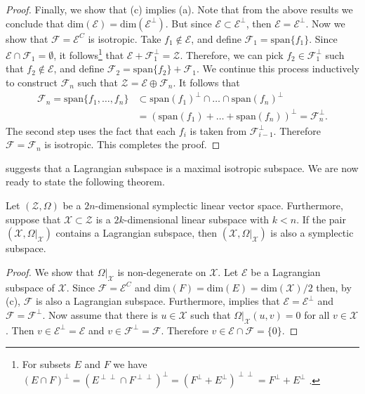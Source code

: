 \begin{proof}
Finally, we show that (c) implies (a). Note that from the above results we conclude that dim$(\mathcal E) = \text{dim}(\mathcal E^{\perp})$. But since $\mathcal E \subset \mathcal E^{\perp}$, then $\mathcal E = \mathcal E^{\perp}$. Now we show that $\mathcal F = \mathcal E^{C}$ is isotropic. Take $f_1 \notin \mathcal E$, and define $\mathcal F_1 = \text{span}\{f_1\}$. Since $\mathcal E \cap \mathcal F_1 = \emptyset$, it follows\footnote{For subsets $E$ and $F$ we have $(E\cap F)^{\perp} = (E^{\perp \perp} \cap F^{\perp \perp})^{\perp} =( F^\perp + E^{\perp})^{\perp \perp} = F^{\perp} + E^\perp$ \cite{abraham1978foundations}.} that $\mathcal E + \mathcal F_1^{\perp} = \mathcal Z$. Therefore, we can pick $f_2\in \mathcal F_1^{\perp}$ such that $f_2\notin \mathcal E$, and define $\mathcal F_2 = \text{span}\{f_2\} + \mathcal F_1$. We continue this process inductively to construct $\mathcal F_n$ such that $\mathcal Z = \mathcal E \oplus \mathcal F_n$. It follows that 
\begin{equation*}
\begin{aligned}
	\mathcal F_n = \text{span}\{f_1,\dots,f_n\} & \subset \text{span}(f_1)^{\perp} \cap \dots \cap \text{span}(f_n)^{\perp} \\
	&= (\text{span}(f_1) + \dots + \text{span}(f_n))^{\perp} =  \mathcal F_n^{\perp}.
\end{aligned}
\end{equation*}
The second step uses the fact that each $f_i$ is taken from $\mathcal F_{i-1}^{\perp}$. Therefore $\mathcal F = \mathcal F_n$ is isotropic. This completes the proof.
\end{proof}

 suggests that a Lagrangian subspace is a maximal isotropic subspace. We are now ready to state the following theorem.

\begin{theorem} \label{theorem:2.14} \cite{abraham1978foundations}
Let $(\mathcal Z, \Omega)$ be a $2n$-dimensional symplectic linear vector space. Furthermore, suppose that $\mathcal X\subset \mathcal Z$ is a $2k$-dimensional linear subspace with $k<n$. If the pair $(\mathcal X,\Omega|_{\mathcal X})$ contains a Lagrangian subspace, then $(\mathcal X,\Omega|_{\mathcal X})$ is also a symplectic subspace.
\end{theorem}
\begin{proof}
We show that $\Omega|_{\mathcal X}$ is non-degenerate on $\mathcal X$. Let $\mathcal E$ be a Lagrangian subspace of $\mathcal X$. Since $\mathcal F = \mathcal E^{C}$ and dim$(F) = \text{dim}(E) = \text{dim}(\mathcal X)/2$ then, by  (c), $\mathcal F$ is also a Lagrangian subspace. Furthermore,  implies that $\mathcal E = \mathcal E^{\perp}$ and $\mathcal F = \mathcal F^{\perp}$. Now assume that there is $u\in\mathcal X$ such that $\Omega|_{\mathcal X}(u,v)=0$ for all $v\in \mathcal X$. Then $v\in \mathcal E^{\perp} = \mathcal E$ and $v\in \mathcal F^{\perp} = \mathcal F$. Therefore $v\in\mathcal E \cap \mathcal F = \{ 0 \}$.
\end{proof}

